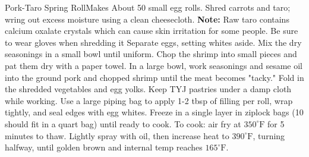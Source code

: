 \documentclass[]{article}
\title{}
\author{}
\begin{document}
\begin{recipe}{Pork-Taro Spring Roll}{}{Makes About 50 small egg rolls.}
	Shred carrots and taro; wring out excess moisture using a clean cheesecloth.
	\textbf{Note:} Raw taro contains calcium oxalate crystals which can cause skin irritation for some people. Be sure to wear gloves when shredding it
	Separate eggs, setting whites aside.
	Mix the dry seasonings in a small bowl until uniform. 
	Chop the shrimp into small pieces and pat them dry with a paper towel.
	In a large bowl, work seasonings and sesame oil into the ground pork and chopped shrimp until the meat becomes "tacky." Fold in the shredded vegetables and egg yolks.
	Keep TYJ pastries under a damp cloth while working. Use a large piping bag to apply 1-2 tbsp of filling per roll, wrap tightly, and seal edges with egg whites. Freeze in a single layer in ziplock bags (10 should fit in a quart bag) until ready to cook.
	To cook: air fry at $350^\circ\mathrm{F}$ for 5 minutes to thaw. Lightly spray with oil, then increase heat to $390^\circ\mathrm{F}$, turning halfway, until golden brown and internal temp reaches $165^\circ\mathrm{F}$. 
\end{recipe}

\end{document}
